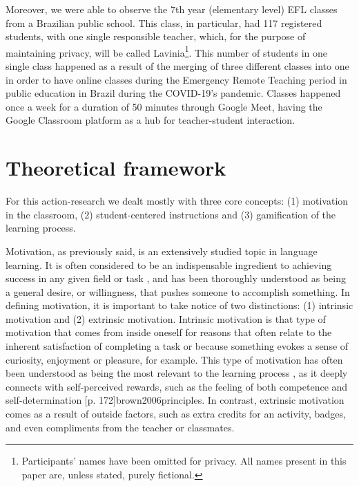 \documentclass[english]{textolivre}
\begin{document}
Moreover, we were able to observe the 7th year (elementary level) EFL classes from a Brazilian public school. This class, in particular, had 117 registered students, with one single responsible teacher, which, for the purpose of maintaining privacy, will be called Lavinia\footnote{Participants’ names have been omitted for privacy. All names present in this paper are, unless stated, purely fictional.}. This number of students in one single class happened as a result of the merging of three different classes into one in order to have online classes during the Emergency Remote Teaching period in public education in Brazil during the COVID-19’s pandemic. Classes happened once a week for a duration of 50 minutes through Google Meet, having the Google Classroom platform as a hub for teacher-student interaction.

\section{Theoretical framework}

For this action-research we dealt mostly with three core concepts: (1) motivation in the classroom, (2) student-centered instructions and (3) gamification of the learning process.

Motivation, as previously said, is an extensively studied topic in language learning. It is often considered to be an indispensable ingredient to achieving success in any given field or task \cite{brown2000douglas, harmer2007practice, celce2014teaching, rjosk2015classroom}, and has been thoroughly understood as being a general desire, or willingness, that pushes someone to accomplish something. In defining motivation, it is important to take notice of two distinctions: (1) intrinsic motivation and (2) extrinsic motivation. Intrinsic motivation is that type of motivation that comes from inside oneself \cite{harmer2007practice} for reasons that often relate to the inherent satisfaction of completing a task or because something evokes a sense of curiosity, enjoyment or pleasure, for example. This type of motivation has often been understood as being the most relevant to the learning process \cite{harmer2007practice, ryan2009promoting}, as it deeply connects with self-perceived rewards, such as the feeling of both competence and self-determination [p. 172]{brown2006principles}. In contrast, extrinsic motivation comes as a result of outside factors, such as extra credits for an activity, badges, and even compliments from the teacher or classmates.
\end{document}
